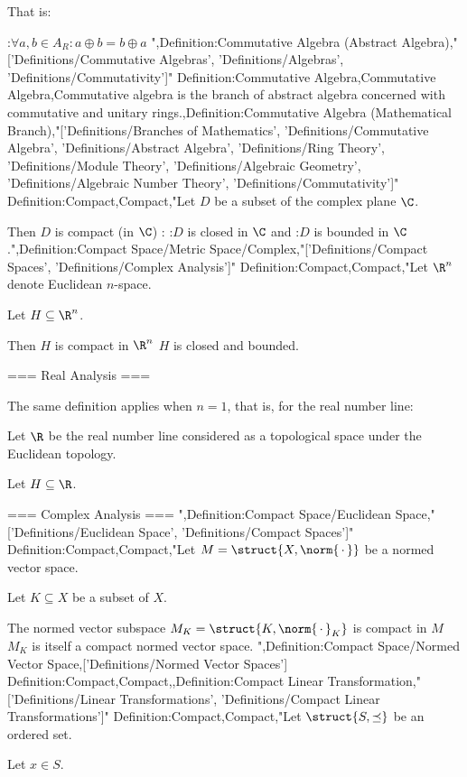 That is:

:$\forall a, b \in A_R: a \oplus b = b \oplus a$
",Definition:Commutative Algebra (Abstract Algebra),"['Definitions/Commutative Algebras', 'Definitions/Algebras', 'Definitions/Commutativity']"
Definition:Commutative Algebra,Commutative Algebra,Commutative algebra is the branch of abstract algebra concerned with commutative and unitary rings.,Definition:Commutative Algebra (Mathematical Branch),"['Definitions/Branches of Mathematics', 'Definitions/Commutative Algebra', 'Definitions/Abstract Algebra', 'Definitions/Ring Theory', 'Definitions/Module Theory', 'Definitions/Algebraic Geometry', 'Definitions/Algebraic Number Theory', 'Definitions/Commutativity']"
Definition:Compact,Compact,"Let $D$ be a subset of the complex plane $\C$.


Then $D$ is compact (in $\C$) :
:$D$ is closed in $\C$
and
:$D$ is bounded in $\C$.",Definition:Compact Space/Metric Space/Complex,"['Definitions/Compact Spaces', 'Definitions/Complex Analysis']"
Definition:Compact,Compact,"Let $\R^n$ denote Euclidean $n$-space.

Let $H \subseteq \R^n$.


Then $H$ is compact in $\R^n$  $H$ is closed and bounded.


=== Real Analysis ===

The same definition applies when $n = 1$, that is, for the real number line:

Let $\R$ be the real number line considered as a topological space under the Euclidean topology.

Let $H \subseteq \R$.



=== Complex Analysis ===
",Definition:Compact Space/Euclidean Space,"['Definitions/Euclidean Space', 'Definitions/Compact Spaces']"
Definition:Compact,Compact,"Let $M = \struct{X, \norm {\,\cdot\,}}$ be a normed vector space.

Let $K \subseteq X$ be a subset of $X$.


The normed vector subspace $M_K = \struct {K, \norm {\,\cdot\,}_K}$ is compact in $M$  $M_K$ is itself a compact normed vector space.
",Definition:Compact Space/Normed Vector Space,['Definitions/Normed Vector Spaces']
Definition:Compact,Compact,,Definition:Compact Linear Transformation,"['Definitions/Linear Transformations', 'Definitions/Compact Linear Transformations']"
Definition:Compact,Compact,"Let $\struct {S, \preceq}$ be an ordered set.

Let $x \in S$.


